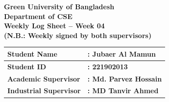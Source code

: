 \documentclass[a4paper,11pt]{article}
\begin{document}
\newpage

\begin{center}
    {\Large \textbf{Green University of Bangladesh}} \\[0.5em]
    {\large \textbf{Department of CSE}} \\[0.5em]
    {\large \textbf{Weekly Log Sheet -- Week 04}} \\[0.5em]
    {\color{red} \textbf{(N.B.: Weekly signed by both supervisors)}}
\end{center}

\vspace{1em}

\begin{tabularx}{\textwidth}{|l|X|}
\hline
\textbf{Student Name} & \textbf{: Jubaer Al Mamun} \\ \hline
\textbf{Student ID} & \textbf{: 221902013} \\ \hline
\textbf{Academic Supervisor} & \textbf{: Md. Parvez Hossain} \\ \hline
\textbf{Industrial Supervisor} & \textbf{: MD Tanvir Ahmed} \\ \hline
\end{tabularx}

\vspace{1em}
\end{document}
